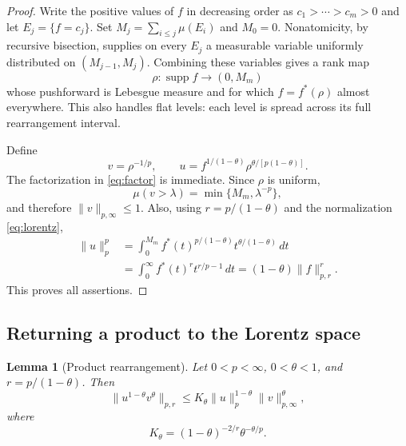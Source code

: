 \documentclass[11pt]{article}
\newtheorem{lemma}[theorem]{Lemma}
\newcommand{\1}{\mathbf 1}
\newcommand{\dd}{\,d}
\begin{document}
\begin{proof}
Write the positive values of $f$ in decreasing order as
$c_1>\cdots>c_m>0$ and let $E_j=\{f=c_j\}$.  Set
$M_j=\sum_{i\le j}\mu(E_i)$ and $M_0=0$.  Nonatomicity, by recursive
bisection, supplies on every $E_j$ a measurable variable uniformly
distributed on $(M_{j-1},M_j)$.  Combining these variables gives a rank
map
\[
 \rho:\operatorname{supp}f\longrightarrow(0,M_m)
\]
whose pushforward is Lebesgue measure and for which
$f=f^*(\rho)$ almost everywhere.  This also handles flat levels: each level
is spread across its full rearrangement interval.

Define
\[
 v=\rho^{-1/p},
 \qquad
 u=f^{1/(1-\theta)}
       \rho^{\theta/[p(1-\theta)]}.
\]
The factorization in \eqref{eq:factor} is immediate.  Since $\rho$ is
uniform,
\[
 \mu(v>\lambda)=\min\{M_m,\lambda^{-p}\},
\]
and therefore $\|v\|_{p,\infty}\le1$.  Also, using
$r=p/(1-\theta)$ and the normalization \eqref{eq:lorentz},
\begin{align*}
 \|u\|_p^p
 &=\int_0^{M_m}f^*(t)^{p/(1-\theta)}
       t^{\theta/(1-\theta)}\dd t\\
 &=\int_0^\infty f^*(t)^r t^{r/p-1}\dd t
  =(1-\theta)\|f\|_{p,r}^r.
\end{align*}
This proves all assertions.
\end{proof}

\subsection{Returning a product to the Lorentz space}

\begin{lemma}[Product rearrangement]\label{lem:product}
Let $0<p<\infty$, $0<\theta<1$, and $r=p/(1-\theta)$.  Then
\begin{equation}\label{eq:product}
 \|u^{1-\theta}v^\theta\|_{p,r}
 \le K_\theta\|u\|_p^{1-\theta}
                 \|v\|_{p,\infty}^\theta,
\end{equation}
where
\begin{equation}\label{eq:K}
 K_\theta=(1-\theta)^{-2/r}\theta^{-\theta/p}.
\end{equation}
\end{lemma}
\end{document}
